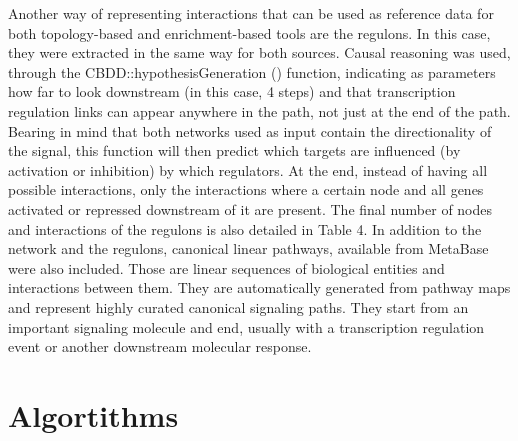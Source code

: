 Another way of representing interactions that can be used as reference data for both topology-based and enrichment-based tools are the regulons. In this case, they were extracted in the same way for both sources. Causal reasoning was used, through the CBDD::hypothesisGeneration () function, indicating as parameters how far to look downstream (in this case, 4 steps) and that transcription regulation links can appear anywhere in the path, not just at the end of the path. Bearing in mind that both networks used as input contain the directionality of the signal, this function will then predict which targets are influenced (by activation or inhibition) by which regulators. At the end, instead of having all possible interactions, only the interactions where a certain node and all genes activated or repressed downstream of it are present. The final number of nodes and interactions of the regulons is also detailed in Table 4. In addition to the network and the regulons, canonical linear pathways, available from MetaBase were also included. Those are linear sequences of biological entities and interactions between them. They are automatically generated from pathway maps and represent highly curated canonical signaling paths. They start from an important signaling molecule and end, usually with a transcription regulation event or another downstream molecular response. 



\section{Algortithms} %
\label{sec:algorithms}

